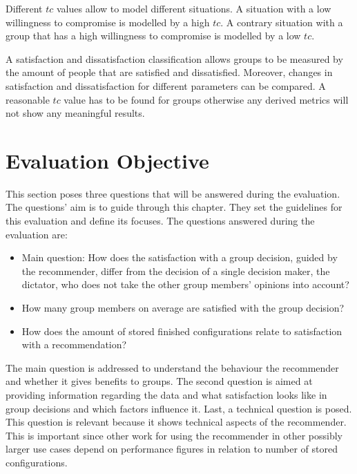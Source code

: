Different $tc$ values allow to model different situations. A situation with a low willingness to compromise is modelled by a high $tc$. A contrary situation with a group that has a high willingness to compromise is modelled by a low $tc$.

A satisfaction and dissatisfaction classification allows groups to be measured by the amount of people that are satisfied and dissatisfied. Moreover, changes in satisfaction and dissatisfaction for different parameters can be compared. A reasonable $tc$ value has to be found for groups otherwise any derived metrics will not show any meaningful results.

\section{Evaluation Objective}
\label{sec:Evaluation:Questions}

This section poses three questions that will be answered during the evaluation. The questions' aim is to guide through this chapter. They set the guidelines for this evaluation and define its focuses. The questions answered during the evaluation are:

\begin{itemize}
    \item Main question: How does the satisfaction with a group decision, guided by the recommender, differ from the decision of a single decision maker, the dictator, who does not take the other group members' opinions into account?
    \item How many group members on average are satisfied with the group decision?
    \item How does the amount of stored finished configurations relate to satisfaction with a recommendation?
\end{itemize}

The main question is addressed to understand the behaviour the recommender and whether it gives benefits to groups. The second question is aimed at providing information regarding the data and what satisfaction looks like in group decisions and which factors influence it. Last, a technical question is posed. This question is relevant because it shows technical aspects of the recommender. This is important since other work for using the recommender in other possibly larger use cases depend on performance figures in relation to number of stored configurations.


